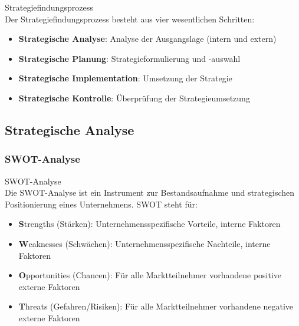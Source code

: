 \begin{definition}{Strategiefindungsprozess}\\
Der Strategiefindungsprozess besteht aus vier wesentlichen Schritten:
\begin{itemize}
    \item \textbf{Strategische Analyse}: Analyse der Ausgangslage (intern und extern)
    \item \textbf{Strategische Planung}: Strategieformulierung und -auswahl
    \item \textbf{Strategische Implementation}: Umsetzung der Strategie
    \item \textbf{Strategische Kontrolle}: Überprüfung der Strategieumsetzung
\end{itemize}
\end{definition}

\subsection{Strategische Analyse}

\subsubsection{SWOT-Analyse}

\begin{definition}{SWOT-Analyse}\\
Die SWOT-Analyse ist ein Instrument zur Bestandsaufnahme und strategischen Positionierung eines Unternehmens. SWOT steht für:
\begin{itemize}
    \item \textbf{S}trengths (Stärken): Unternehmensspezifische Vorteile, interne Faktoren
    \item \textbf{W}eaknesses (Schwächen): Unternehmensspezifische Nachteile, interne Faktoren
    \item \textbf{O}pportunities (Chancen): Für alle Marktteilnehmer vorhandene positive externe Faktoren
    \item \textbf{T}hreats (Gefahren/Risiken): Für alle Marktteilnehmer vorhandene negative externe Faktoren
\end{itemize}
\end{definition}

